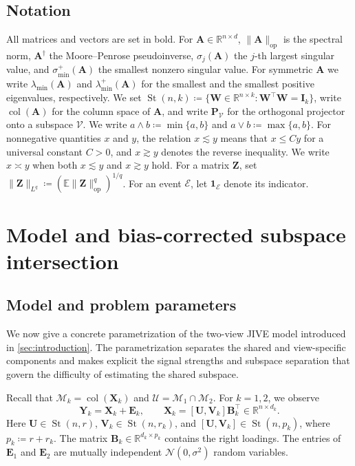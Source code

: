 \documentclass[11pt]{article}
\newcommand{\ind}{\bm{1}}
\newcommand{\trans}{\top}
\DeclareMathOperator{\St}{St}
\newcommand{\cU}{\mathcal{U}}
\newcommand{\cM}{\mathcal{M}}
\newcommand{\cE}{\mathcal{E}}
\begin{document}
\subsection{Notation}
\label{sec:notation}

All matrices and vectors are set in bold. For
$\bm A\in\mathbb R^{n\times d}$, $\|\bm A\|_{\mathrm{op}}$ is the spectral norm,
$\bm A^{\dagger}$ the Moore--Penrose pseudoinverse, $\sigma_j(\bm A)$ the $j$-th
largest singular value, and $\sigma^{+}_{\min}(\bm A)$ the smallest nonzero
singular value. For symmetric $\bm A$ we write $\lambda_{\min}(\bm A)$ and
$\lambda^{+}_{\min}(\bm A)$ for the smallest and the smallest positive eigenvalues, respectively. We set
$\operatorname{St}(n,k)\coloneqq\{\bm W\in\mathbb R^{n\times k}:
\bm W^{\top}\bm W=\bm I_k\}$, write $\operatorname{col}(\bm A)$ for the column
space of $\bm A$, and write $\bm P_{\mathcal V}$ for the orthogonal projector onto a subspace
$\mathcal V$. We write
$a\wedge b\coloneqq\min\{a,b\}$ and
$a\vee b\coloneqq\max\{a,b\}$. For nonnegative quantities $x$ and $y$,
the relation $x\lesssim y$ means that $x\le Cy$ for a universal constant
$C>0$, and $x\gtrsim y$ denotes the reverse inequality. We write
$x\asymp y$ when both $x\lesssim y$ and $x\gtrsim y$ hold. For a matrix
$\bm Z$, set
$\|\bm Z\|_{L^q}\coloneqq(\mathbb E\|\bm Z\|_{\mathrm{op}}^q)^{1/q}$.
For an event $\cE$, let $\ind_{\cE}$ denote its indicator.

\section{Model and bias-corrected subspace intersection}
\label{sec:estimator}


\subsection{Model and problem parameters}
\label{sec:formulation}
We now give a concrete parametrization of the two-view JIVE model introduced in
\cref{sec:introduction}. The parametrization separates the shared and
view-specific components and makes explicit the signal strengths and subspace
separation that govern the difficulty of estimating the shared subspace.

Recall that
$\cM_k=\operatorname{col}(\bm X_k)$ and
$\cU=\cM_1\cap\cM_2$.
For $k=1,2$, we observe
\begin{equation}
\label{eq:model}
  \bm Y_k=\bm X_k+\bm E_k,
  \qquad
  \bm X_k=[\bm U,\bm V_k]\bm B_k^\trans
  \in\mathbb R^{n\times d_k}.
\end{equation}
Here
$\bm U\in\St(n,r)$,
$\bm V_k\in\St(n,r_k)$, and
$[\bm U,\bm V_k]\in\St(n,p_k)$, where
$p_k\coloneqq r+r_k$.
The matrix
$\bm B_k\in\mathbb R^{d_k\times p_k}$
contains the right loadings.
The entries of $\bm E_1$ and $\bm E_2$ are mutually independent
$\mathcal N(0,\sigma^2)$ random variables.
\end{document}
